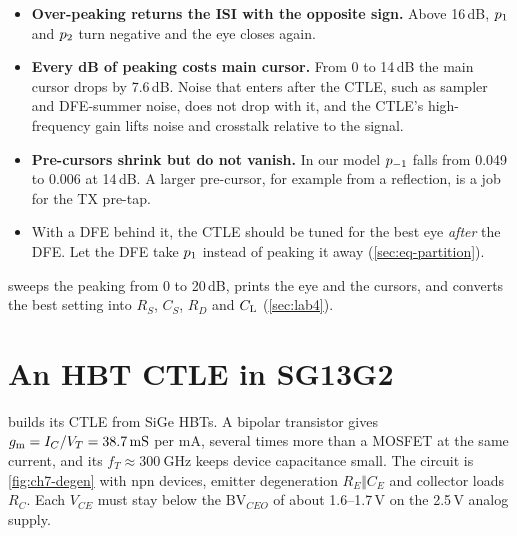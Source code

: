 \begin{insight}
\begin{itemize}
  \item \textbf{Over-peaking returns the ISI with the opposite sign.} Above 16\,dB, $p_{1}$ and $p_{2}$ turn negative and the eye closes again.
  \item \textbf{Every dB of peaking costs main cursor.} From 0 to 14\,dB the main cursor drops by 7.6\,dB. Noise that enters after the CTLE, such as sampler and DFE-summer noise, does not drop with it, and the CTLE's high-frequency gain lifts noise and crosstalk relative to the signal.
  \item \textbf{Pre-cursors shrink but do not vanish.} In our model $p_{-1}$ falls from 0.049 to 0.006 at 14\,dB. A larger pre-cursor, for example from a reflection, is a job for the TX pre-tap.
  \item With a DFE behind it, the CTLE should be tuned for the best eye \emph{after} the DFE. Let the DFE take $p_{1}$ instead of peaking it away (\cref{sec:eq-partition}).
\end{itemize}
\end{insight}

\begin{tryit}
 sweeps the peaking from 0 to 20\,dB, prints the eye and the cursors, and converts the best setting into $R_S$, $C_S$, $R_D$ and $C_\mathrm{L}$ (\cref{sec:lab4}).
\end{tryit}

\section{An HBT CTLE in SG13G2}\label{sec:ctle-hbt}

\OS{} builds its CTLE from \sgx{} SiGe HBTs. A bipolar transistor gives $\gm=I_C/V_T=\qty{38.7}{\milli\siemens}$ per mA, several times more than a MOSFET at the same current, and its $f_T\approx\qty{300}{\giga\hertz}$ keeps device capacitance small. The circuit is \cref{fig:ch7-degen} with npn devices, emitter degeneration $R_E\Vert C_E$ and collector loads $R_C$. Each $V_{CE}$ must stay below the $\mathrm{BV}_{CEO}$ of about 1.6--1.7\,V on the 2.5\,V analog supply.

